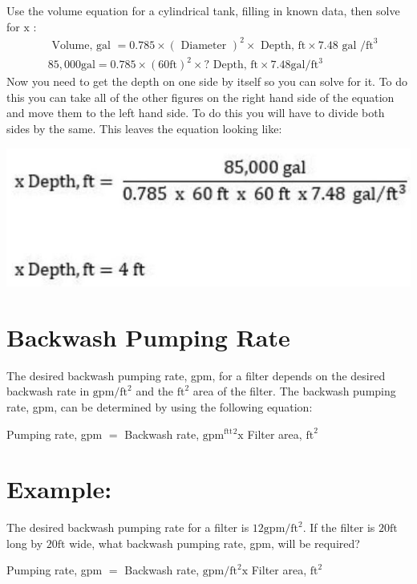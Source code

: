 \documentclass[10pt]{article}
\begin{document}
Use the volume equation for a cylindrical tank, filling in known data, then solve for $\mathrm{x}$ :
$$
\begin{aligned}
&\text { Volume, gal }=0.785 \times(\text { Diameter })^{2} \times \text { Depth, } \mathrm{ft} \times 7.48 \text { gal } / \mathrm{ft}^{3} \\
&85,000 \mathrm{gal}=0.785 \times(60 \mathrm{ft})^{2} \times ? \text { Depth, } \mathrm{ft} \times 7.48 \mathrm{gal} / \mathrm{ft}^{3}
\end{aligned}
$$
Now you need to get the depth on one side by itself so you can solve for it. To do this you can take all of the other figures on the right hand side of the equation and move them to the left hand side. To do this you will have to divide both sides by the same. This leaves the equation looking like:

\includegraphics[max width=\textwidth]{2022_10_14_fef65bffdeb472549abeg-09}

\section{Backwash Pumping Rate}
The desired backwash pumping rate, gpm, for a filter depends on the desired backwash rate in $\mathrm{gpm} / \mathrm{ft}^{2}$ and the $\mathrm{ft}^{2}$ area of the filter. The backwash pumping rate, gpm, can be determined by using the following equation:

Pumping rate, gpm $=$ Backwash rate, $\mathrm{gpm}^{\mathrm{ftt}}{ }^{2} \mathrm{x}$ Filter area, $\mathrm{ft}^{2}$

\section{Example:}
The desired backwash pumping rate for a filter is $12 \mathrm{gpm} / \mathrm{ft}^{2}$. If the filter is $20 \mathrm{ft}$ long by $20 \mathrm{ft}$ wide, what backwash pumping rate, gpm, will be required?

Pumping rate, gpm $=$ Backwash rate, $\mathrm{gpm} / \mathrm{ft}^{2} \mathrm{x}$ Filter area, $\mathrm{ft}^{2}$
\end{document}
